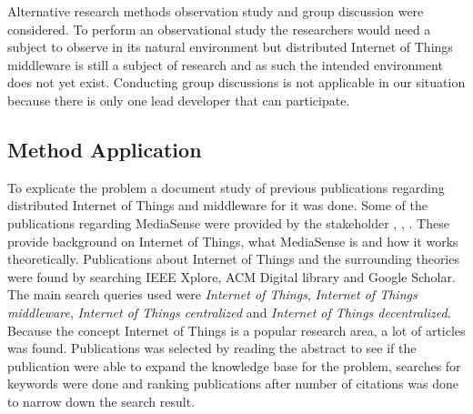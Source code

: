 Alternative research methods observation study and group discussion were considered. To perform an observational study the researchers would need a subject to observe in its natural environment but distributed Internet of Things middleware is still a subject of research and as such the intended environment does not yet exist. Conducting group discussions is not applicable in our situation because there is only one lead developer that can participate. 

%

\subsection{Method Application}
To explicate the problem a document study of previous publications regarding distributed Internet of Things and middleware for it was done. Some of the publications regarding MediaSense were provided by the stakeholder \cite{TheMediaSenseFramework}, \cite{Kanter539187}, \cite{Walters413794}. These provide background on Internet of Things, what MediaSense is and how it works theoretically. Publications about Internet of Things and the surrounding theories were found by searching IEEE Xplore, ACM Digital library and Google Scholar. The main search queries used were \emph{Internet of Things}, \emph{Internet of Things middleware}, \emph{Internet of Things centralized} and \emph{Internet of Things decentralized}. Because the concept Internet of Things is a popular research area, a lot of articles was found. Publications was selected by reading the abstract to see if the publication were able to expand the knowledge base for the problem, searches for keywords were done and ranking publications after number of citations was done to narrow down the search result. 

